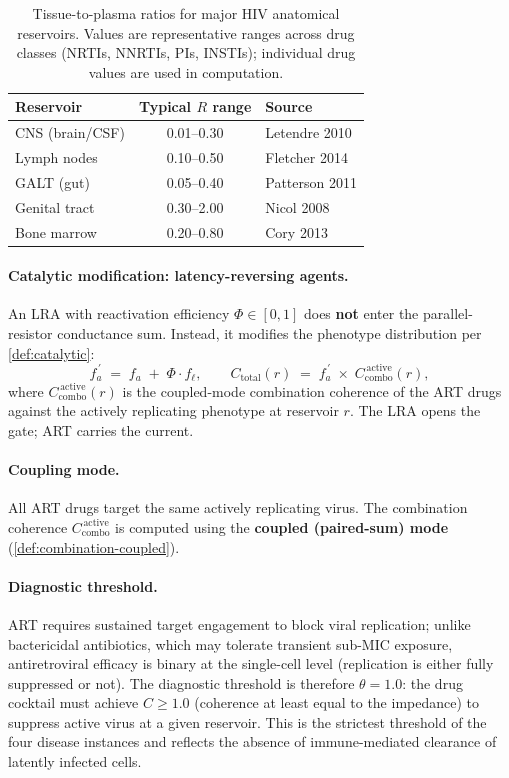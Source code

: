 \documentclass[11pt]{article}
\theoremstyle{plain}
\theoremstyle{definition}
\newcommand{\Ccombo}{C_{\mathrm{combo}}}
\begin{document}
\begin{table}[t]
\centering
\small
\begin{tabular}{lcl}
\toprule
\textbf{Reservoir} & \textbf{Typical $R$ range} &
  \textbf{Source} \\
\midrule
CNS (brain/CSF)     & 0.01--0.30 & Letendre 2010 \\
Lymph nodes         & 0.10--0.50 & Fletcher 2014 \\
GALT (gut)          & 0.05--0.40 & Patterson 2011 \\
Genital tract       & 0.30--2.00 & Nicol 2008 \\
Bone marrow         & 0.20--0.80 & Cory 2013 \\
\bottomrule
\end{tabular}
\caption{Tissue-to-plasma ratios for major HIV anatomical
reservoirs. Values are representative ranges across drug classes
(NRTIs, NNRTIs, PIs, INSTIs); individual drug values are used in
computation.}
\label{tab:hiv-reservoirs}
\end{table}

\paragraph{Catalytic modification: latency-reversing agents.}
An LRA with reactivation efficiency $\Phi \in [0, 1]$ does
\textbf{not} enter the parallel-resistor conductance sum. Instead,
it modifies the phenotype distribution per
\cref{def:catalytic}:
\begin{equation}
  \label{eq:hiv-catalytic}
  f_a^{\,\prime} \;=\; f_a \;+\; \Phi \cdot f_\ell,
  \qquad
  C_{\mathrm{total}}(r) \;=\; f_a^{\,\prime} \;\times\;
  \Ccombo^{\,\mathrm{active}}(r),
\end{equation}
where $\Ccombo^{\,\mathrm{active}}(r)$ is the coupled-mode
combination coherence of the ART drugs against the actively
replicating phenotype at reservoir $r$. The LRA opens the gate;
ART carries the current.

\paragraph{Coupling mode.}
All ART drugs target the same actively replicating virus. The
combination coherence $\Ccombo^{\,\mathrm{active}}$ is computed
using the \textbf{coupled (paired-sum) mode}
(\cref{def:combination-coupled}).

\paragraph{Diagnostic threshold.}
ART requires sustained target engagement to block viral replication;
unlike bactericidal antibiotics, which may tolerate transient
sub-MIC exposure, antiretroviral efficacy is binary at the
single-cell level (replication is either fully suppressed or not).
The diagnostic threshold is therefore $\theta = 1.0$: the drug
cocktail must achieve $C \geq 1.0$ (coherence at least equal to
the impedance) to suppress active virus at a given reservoir. This
is the strictest threshold of the four disease instances and
reflects the absence of immune-mediated clearance of latently
infected cells.
\end{document}
